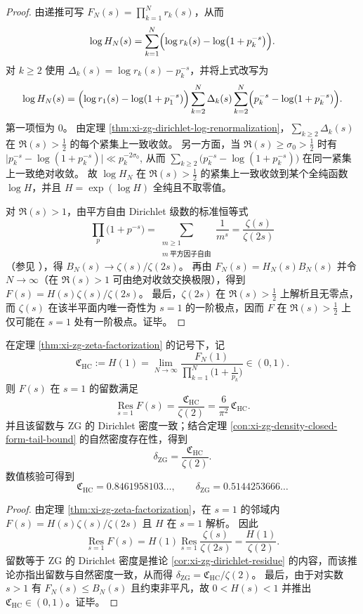 \begin{proof}
由递推可写 \(F_N(s)=\prod_{k=1}^{N}r_k(s)\)，从而
\[
\log H_N(s)
=\sum_{k=1}^{N}\Bigl(\log r_k(s)-\log\bigl(1+p_k^{-s}\bigr)\Bigr).
\]
对 \(k\ge 2\) 使用 \(\Delta_k(s)=\log r_k(s)-p_k^{-s}\)，并将上式改写为
\[
\log H_N(s)
=\Bigl(\log r_1(s)-\log(1+p_1^{-s})\Bigr)
\sum_{k=2}^{N}\Delta_k(s)
\sum_{k=2}^{N}\Bigl(p_k^{-s}-\log(1+p_k^{-s})\Bigr).
\]
第一项恒为 \(0\)。
由定理 \ref{thm:xi-zg-dirichlet-log-renormalization}，\(\sum_{k\ge 2}\Delta_k(s)\) 在 \(\Re(s)>\tfrac12\) 的每个紧集上一致收敛。
另一方面，当 \(\Re(s)\ge \sigma_0>\tfrac12\) 时有
\(
\bigl|p_k^{-s}-\log(1+p_k^{-s})\bigr|
\ll p_k^{-2\sigma_0}
\),
从而 \(\sum_{k\ge 2}\bigl(p_k^{-s}-\log(1+p_k^{-s})\bigr)\) 在同一紧集上一致绝对收敛。
故 \(\log H_N\) 在 \(\Re(s)>\tfrac12\) 的紧集上一致收敛到某个全纯函数 \(\log H\)，并且 \(H=\exp(\log H)\) 全纯且不取零值。

对 \(\Re(s)>1\)，由平方自由 Dirichlet 级数的标准恒等式
\[
\prod_{p}\bigl(1+p^{-s}\bigr)
=\sum_{\substack{m\ge 1\\ m\ \text{平方因子自由}}}\frac1{m^s}
=\frac{\zeta(s)}{\zeta(2s)}
\]
（参见 \cite{Apostol1976,Titchmarsh1986RiemannZeta}），得 \(B_N(s)\to \zeta(s)/\zeta(2s)\)。
再由 \(F_N(s)=H_N(s)B_N(s)\) 并令 \(N\to\infty\)（在 \(\Re(s)>1\) 可由绝对收敛交换极限），得到 \(F(s)=H(s)\zeta(s)/\zeta(2s)\)。
最后，\(\zeta(2s)\) 在 \(\Re(s)>\tfrac12\) 上解析且无零点，而 \(\zeta(s)\) 在该半平面内唯一奇性为 \(s=1\) 的一阶极点，因而 \(F\) 在 \(\Re(s)>\tfrac12\) 上仅可能在 \(s=1\) 处有一阶极点。证毕。
\end{proof}

\begin{corollary}[素数路径硬核常数与 \texorpdfstring{$s=1$}{s=1} 留数]\label{cor:xi-zg-hardcore-constant-residue}
在定理 \ref{thm:xi-zg-zeta-factorization} 的记号下，记
\[
\mathfrak C_{\mathrm{HC}}:=H(1)=\lim_{N\to\infty}\frac{F_N(1)}{\prod_{k=1}^{N}\bigl(1+\frac1{p_k}\bigr)}\in(0,1).
\]
则 \(F(s)\) 在 \(s=1\) 的留数满足
\[
\operatorname*{Res}_{s=1}F(s)=\frac{\mathfrak C_{\mathrm{HC}}}{\zeta(2)}=\frac{6}{\pi^2}\,\mathfrak C_{\mathrm{HC}}.
\]
并且该留数与 \(\mathrm{ZG}\) 的 Dirichlet 密度一致；结合定理 \ref{con:xi-zg-density-closed-form-tail-bound} 的自然密度存在性，得到
\[
\delta_{\mathrm{ZG}}=\frac{\mathfrak C_{\mathrm{HC}}}{\zeta(2)}.
\]
数值核验可得到
\[
\mathfrak C_{\mathrm{HC}}=0.8461958103\ldots,
\qquad
\delta_{\mathrm{ZG}}=0.5144253666\ldots
\]
\end{corollary}

\begin{proof}
由定理 \ref{thm:xi-zg-zeta-factorization}，在 \(s=1\) 的邻域内
\(
F(s)=H(s)\zeta(s)/\zeta(2s)
\)
且 \(H\) 在 \(s=1\) 解析。
因此
\[
\operatorname*{Res}_{s=1}F(s)
=H(1)\operatorname*{Res}_{s=1}\frac{\zeta(s)}{\zeta(2s)}
=\frac{H(1)}{\zeta(2)}.
\]
留数等于 \(\mathrm{ZG}\) 的 Dirichlet 密度是推论 \ref{cor:xi-zg-dirichlet-residue} 的内容，而该推论亦指出留数与自然密度一致，从而得 \(\delta_{\mathrm{ZG}}=\mathfrak C_{\mathrm{HC}}/\zeta(2)\)。
最后，由于对实数 \(s>1\) 有 \(F_N(s)\le B_N(s)\) 且约束非平凡，故 \(0<H(s)<1\) 并推出 \(\mathfrak C_{\mathrm{HC}}\in(0,1)\)。证毕。
\end{proof}

